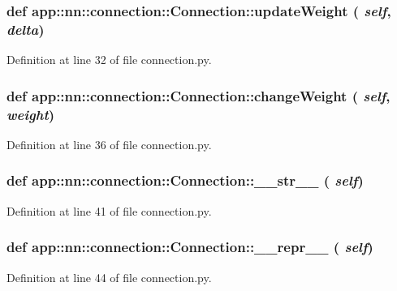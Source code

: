 \subsubsection{\setlength{\rightskip}{0pt plus 5cm}def app::nn::connection::Connection::updateWeight ( {\em self},  {\em delta})}\label{classapp_1_1nn_1_1connection_1_1Connection_5ec681be1e5731b09a6c78bcb79c041a}




Definition at line 32 of file connection.py.
\subsubsection{\setlength{\rightskip}{0pt plus 5cm}def app::nn::connection::Connection::changeWeight ( {\em self},  {\em weight})}\label{classapp_1_1nn_1_1connection_1_1Connection_62962e88228fba3d6fd7f30b69b13ebc}




Definition at line 36 of file connection.py.
\subsubsection{\setlength{\rightskip}{0pt plus 5cm}def app::nn::connection::Connection::\_\-\_\-str\_\-\_\- ( {\em self})}\label{classapp_1_1nn_1_1connection_1_1Connection_fe67c78ad8cc4eb9d7944ae6c934f8ec}




Definition at line 41 of file connection.py.
\subsubsection{\setlength{\rightskip}{0pt plus 5cm}def app::nn::connection::Connection::\_\-\_\-repr\_\-\_\- ( {\em self})}\label{classapp_1_1nn_1_1connection_1_1Connection_b1e35cd8dea56db8f6ebdc436351de31}




Definition at line 44 of file connection.py.

